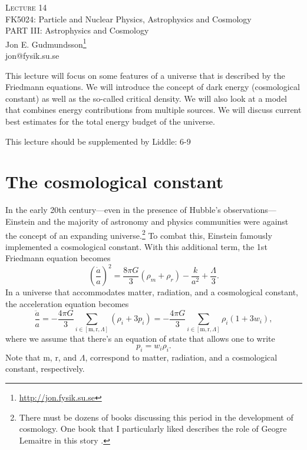 \documentclass[a4paper,12pt]{article}
\theoremstyle{remark}
\newcommand{\mrm}[1]{\mathrm{#1}}
\renewcommand{\=}[1]{\stackrel{#1}{=}} %
\newcommand{\linkc}[1]{\textcolor{linkc}{#1}}
\theoremstyle{plain}
\theoremstyle{definition}
\begin{document}
\fontsize{5mm}{6mm}\selectfont\thispagestyle{empty}

\thispagestyle{empty}
\begin{center}
\textsc{Lecture 14}\\[1.5ex]
{\Huge FK5024: Particle and Nuclear Physics, Astrophysics and Cosmology\\}
\vspace{3mm}
{\large PART III: Astrophysics and Cosmology \\}
Jon E. Gudmundsson\footnote{\href{http://jon.fysik.su.se}{\linkc{http://jon.fysik.su.se}}} \\
\linkc{jon@fysik.su.se}
\end{center}

This lecture will focus on some features of a universe that is described by the Friedmann equations. We will introduce the concept of dark energy (cosmological constant) as well as the so-called critical density. We will also look at a model that combines energy contributions from multiple sources. We will discuss current best estimates for the total energy budget of the universe.
\begin{attention}
This lecture should be supplemented by Liddle: 6-9
\end{attention}

\section{The cosmological constant}
In the early 20th century---even in the presence of Hubble's observations---Einstein and the majority of astronomy and physics communities were against the concept of an expanding universe.\footnote{There must be dozens of books discussing this period in the development of cosmology. One book that I particularly liked describes the role of Geogre Lemaitre in this story \cite{Lemaitre2005}.} To combat this, Einstein famously implemented a cosmological constant. With this additional term, the 1st Friedmann equation becomes
\begin{equation}
\left( \frac{\dot{a}}{a} \right)^{2} = \frac{8\pi G}{3} (\rho _m + \rho _r)  - \frac{k}{a^{2}} + \frac{\Lambda}{3}.
\label{eq:friedmann1}
\end{equation}
In a universe that accommodates matter, radiation, and a cosmological constant, the acceleration equation becomes
\begin{equation}
\frac{\ddot{a}}{a} = - \frac{4 \pi G}{3} \sum _{i \in [\mrm{m}, \mrm{r}, \Lambda]}(\rho_i +3p_i) = - \frac{4 \pi G}{3} \sum _{i \in [\mrm{m}, \mrm{r}, \Lambda]}\rho_i(1 +3w_i),
\end{equation}
where we assume that there's an equation of state that allows one to write
\begin{equation}
p_i = w_i \rho _i.
\end{equation}
Note that m, r, and $\Lambda$, correspond to matter, radiation, and a cosmological constant, respectively.
\end{document}
